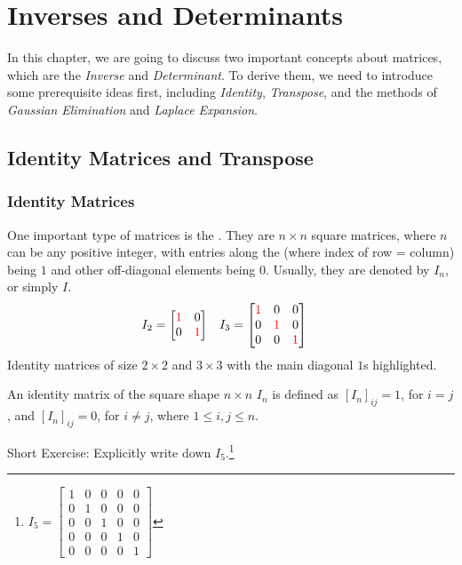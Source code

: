 \chapter{Inverses and Determinants}

In this chapter, we are going to discuss two important concepts about matrices, which are the \textit{Inverse} and \textit{Determinant}. To derive them, we need to introduce some prerequisite ideas first, including \textit{Identity}, \textit{Transpose}, and the methods of \textit{Gaussian Elimination} and \textit{Laplace Expansion}.

\section{Identity Matrices and Transpose}

\subsection{Identity Matrices}
One important type of matrices is the . They are $n \times n$ square matrices, where $n$ can be any positive integer, with entries along the  (where index of row = column) being $1$ and other off-diagonal elements being $0$. Usually, they are denoted by $I_n$, or simply $I$.
\begin{align*}
I_2 &= 
\begin{bmatrix}
\textcolor{red}{1} & 0 \\
0 & \textcolor{red}{1}
\end{bmatrix}
& I_3 &= 
\begin{bmatrix}
\textcolor{red}{1} & 0 & 0 \\
0 & \textcolor{red}{1} & 0 \\
0 & 0 & \textcolor{red}{1}
\end{bmatrix}
\end{align*}
Identity matrices of size $2 \times 2$ and $3 \times 3$ with the main diagonal $1$s highlighted.
\begin{defn}
An identity matrix of the square shape $n \times n$ $I_n$ is defined as $[I_{n}]_{ij} = 1$, for $i = j$, and $[I_{n}]_{ij} = 0$, for $i \neq j$, where $1 \leq i,j \leq n$.
\end{defn}
Short Exercise: Explicitly write down $I_5$.\footnote{$I_5=
\begin{bmatrix}
1 & 0 & 0 & 0 & 0 \\
0 & 1 & 0 & 0 & 0 \\
0 & 0 & 1 & 0 & 0 \\
0 & 0 & 0 & 1 & 0 \\
0 & 0 & 0 & 0 & 1
\end{bmatrix}$}\\

